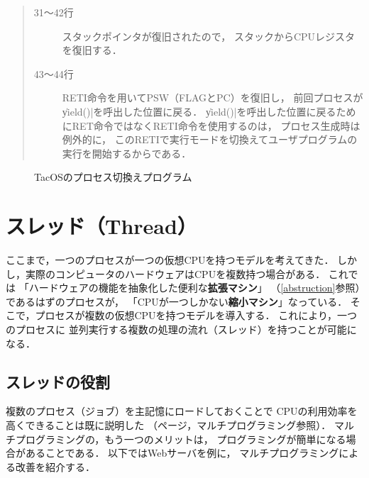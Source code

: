 \begin{quote}
\begin{description}
\item[31〜42行] スタックポインタが復旧されたので，
スタックからCPUレジスタを復旧する．

\item[43〜44行] RETI命令を用いてPSW（FLAGとPC）を復旧し，
前回プロセスが\|yield()|を呼出した位置に戻る．
\|yield()|を呼出した位置に戻るためにRET命令ではなくRETI命令を使用するのは，
プロセス生成時は例外的に，
このRETIで実行モードを切換えてユーザプログラムの実行を開始するからである．
\end{description}
\end{quote}

\begin{figure}[btp]

\caption{TacOSのプロセス切換えプログラム}
\label{fig:tacosDispatcher}
\end{figure}

\section{スレッド（Thread）}
ここまで，一つのプロセスが一つの仮想CPUを持つモデルを考えてきた．
しかし，実際のコンピュータのハードウェアはCPUを複数持つ場合がある．
これでは
「ハードウェアの機能を抽象化した便利な{\bf 拡張マシン}」
（\ref{abstruction}参照）であるはずのプロセスが，
「CPUが一つしかない{\bf 縮小マシン}」なっている．
そこで，プロセスが複数の仮想CPUを持つモデルを導入する．
これにより，一つのプロセスに
並列実行する複数の処理の流れ（スレッド）を持つことが可能になる．

\subsection{スレッドの役割}
複数のプロセス（ジョブ）を主記憶にロードしておくことで
CPUの利用効率を高くできることは既に説明した
（\pageref{multiprogramming}ページ，マルチプログラミング参照）．
マルチプログラミングの，もう一つのメリットは，
プログラミングが簡単になる場合があることである．
以下ではWebサーバを例に，
マルチプログラミングによる改善を紹介する．


